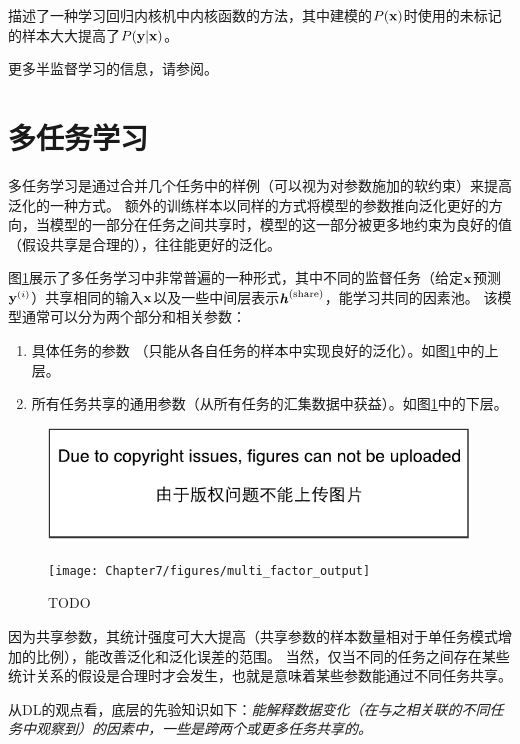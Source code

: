 \cite{Russ+Geoff-nips-2007}描述了一种学习回归内核机中内核函数的方法，其中建模的$P(\mathbf{x})$时使用的未标记的样本大大提高了$P(\mathbf{y} | \mathbf{x})$。

更多半监督学习的信息，请参阅\cite{SSL-Book-2006}。

\section{多任务学习}
\label{sec:multitask_learning}
多任务学习\citep{caruana93a}是通过合并几个任务中的样例（可以视为对参数施加的软约束）来提高泛化的一种方式。
额外的训练样本以同样的方式将模型的参数推向泛化更好的方向，当模型的一部分在任务之间共享时，模型的这一部分被更多地约束为良好的值（假设共享是合理的），往往能更好的泛化。

图\ref{fig:chap7_multi_factor_output}展示了多任务学习中非常普遍的一种形式，其中不同的监督任务（给定$\mathbf{x}$预测$\mathbf{y}^{(i)}$）共享相同的输入$\mathbf{x}$以及一些中间层表示$\boldsymbol{\mathit{h}}^{(\text{share})}$，能学习共同的因素池。
该模型通常可以分为两个部分和相关参数：
\begin{enumerate}
 \item 具体任务的参数 （只能从各自任务的样本中实现良好的泛化）。如图\ref{fig:chap7_multi_factor_output}中的上层。
 \item 所有任务共享的通用参数（从所有任务的汇集数据中获益）。如图\ref{fig:chap7_multi_factor_output}中的下层。
\end{enumerate}
\begin{figure}[!htb]
\ifOpenSource
\centerline{\includegraphics{figure.pdf}}
\else
\centerline{\texttt{[image: Chapter7/figures/multi\_factor\_output]}}
\fi
\caption{TODO}
\label{fig:chap7_multi_factor_output}
\end{figure}

因为共享参数，其统计强度可大大提高（共享参数的样本数量相对于单任务模式增加的比例），能改善泛化和泛化误差的范围\citep{baxter95a}。
当然，仅当不同的任务之间存在某些统计关系的假设是合理时才会发生，也就是意味着某些参数能通过不同任务共享。

从\gls{DL}的观点看，底层的先验知识如下：\emph{能解释数据变化（在与之相关联的不同任务中观察到）的因素中，一些是跨两个或更多任务共享的。}

